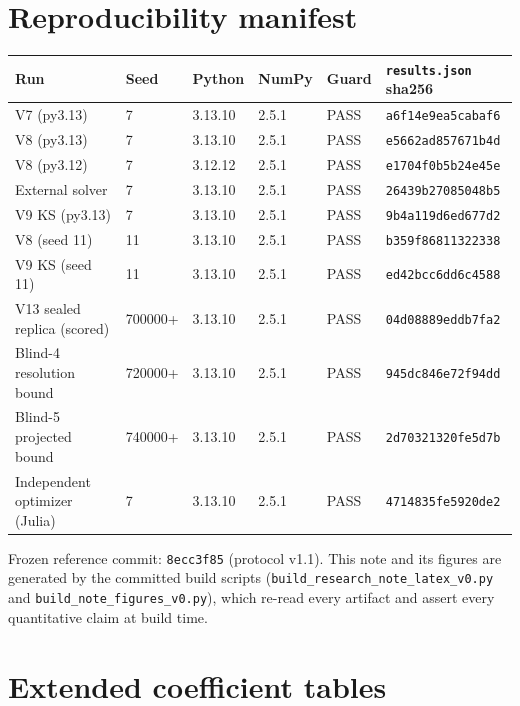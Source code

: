 \documentclass[11pt]{article}
\begin{document}
\section{Reproducibility manifest}
\begin{center}\small
\begin{tabular}{llllll}
\toprule
Run & Seed & Python & NumPy & Guard & \texttt{results.json} sha256 \\
\midrule
V7 (py3.13) & 7 & 3.13.10 & 2.5.1 & PASS & \texttt{a6f14e9ea5cabaf6} \\
V8 (py3.13) & 7 & 3.13.10 & 2.5.1 & PASS & \texttt{e5662ad857671b4d} \\
V8 (py3.12) & 7 & 3.12.12 & 2.5.1 & PASS & \texttt{e1704f0b5b24e45e} \\
External solver & 7 & 3.13.10 & 2.5.1 & PASS & \texttt{26439b27085048b5} \\
V9 KS (py3.13) & 7 & 3.13.10 & 2.5.1 & PASS & \texttt{9b4a119d6ed677d2} \\
V8 (seed 11) & 11 & 3.13.10 & 2.5.1 & PASS & \texttt{b359f86811322338} \\
V9 KS (seed 11) & 11 & 3.13.10 & 2.5.1 & PASS & \texttt{ed42bcc6dd6c4588} \\
V13 sealed replica (scored) & 700000+ & 3.13.10 & 2.5.1 & PASS & \texttt{04d08889eddb7fa2} \\
Blind-4 resolution bound & 720000+ & 3.13.10 & 2.5.1 & PASS & \texttt{945dc846e72f94dd} \\
Blind-5 projected bound & 740000+ & 3.13.10 & 2.5.1 & PASS & \texttt{2d70321320fe5d7b} \\
Independent optimizer (Julia) & 7 & 3.13.10 & 2.5.1 & PASS & \texttt{4714835fe5920de2} \\
\bottomrule
\end{tabular}
\end{center}
Frozen reference commit: \texttt{8ecc3f85} (protocol v1.1). This note and
its figures are generated by the committed build scripts
(\texttt{build\_research\_note\_latex\_v0.py} and
\texttt{build\_note\_figures\_v0.py}), which re-read every artifact and
assert every quantitative claim at build time.

\section{Extended coefficient tables}
\label{app:tables}
\end{document}
